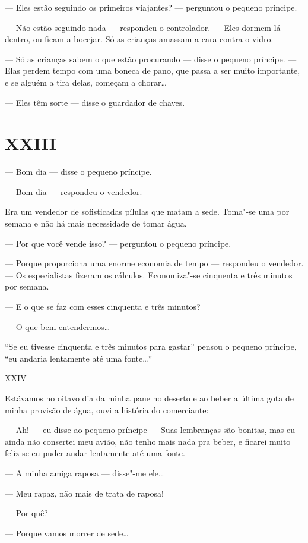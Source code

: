 \begin{Parallel}[p]{}{}
{--- Eles estão seguindo os primeiros viajantes? --- perguntou o pequeno
príncipe.

--- Não estão seguindo nada --- respondeu o controlador. --- Eles dormem lá
dentro, ou ficam a bocejar. Só as crianças amassam a cara contra o
vidro.

--- Só as crianças sabem o que estão procurando --- disse o pequeno
príncipe. --- Elas perdem tempo com uma boneca de pano, que passa a ser
muito importante, e se alguém a tira delas, começam a chorar\ldots{}

--- Eles têm sorte --- disse o guardador de chaves.

\section{XXIII}

--- Bom dia --- disse o pequeno príncipe.

--- Bom dia --- respondeu o vendedor.

Era um vendedor de sofisticadas pílulas que matam a sede. Toma"-se uma
por semana e não há mais necessidade de tomar água.

--- Por que você vende isso? --- perguntou o pequeno príncipe.

--- Porque proporciona uma enorme economia de tempo --- respondeu o
vendedor. --- Os especialistas fizeram os cálculos. Economiza"-se
cinquenta e três minutos por semana.

--- E o que se faz com esses cinquenta e três minutos?

--- O que bem entendermos\ldots{}

``Se eu tivesse cinquenta e três minutos para gastar'' pensou o pequeno
príncipe, ``eu andaria lentamente até uma fonte\ldots{}''

XXIV

Estávamos no oitavo dia da minha pane no deserto e ao beber a última
gota de minha provisão de água, ouvi a história do comerciante:

--- Ah! --- eu disse ao pequeno príncipe --- Suas lembranças são bonitas,
mas eu ainda não consertei meu avião, não tenho mais nada pra beber, e
ficarei muito feliz se eu puder andar lentamente até uma fonte.

--- A minha amiga raposa --- disse"-me ele\ldots{}

--- Meu rapaz, não mais de trata de raposa!

--- Por quê?

--- Porque vamos morrer de sede\ldots{}

}
\end{Parallel}
